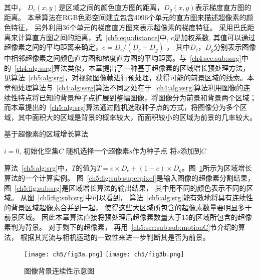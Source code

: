 其中， $D_c(x,y)$是区域之间的颜色直方图的距离，$D_g(x,y)$表示梯度直方图的距离。 本章算法在RGB色彩空间建立包含4096个单元的直方图来描述超像素的颜色特征， 另外利用36个单元的梯度直方图来表示超像素的梯度特征。 采用巴氏距离来计算直方图之间的距离，式~\ref{ch5:equ:distance}中, $c$是加权系数, 其值可以通过超像素之间的平均距离来确定，$c = D_c / (D_c + D_g)$  ， 其中$D_c$，$D_g$分别表示图像中相邻超像素之间颜色直方图和梯度直方图的平均距离。与~\ref{ch4:sec:sub:ssrg}中的~\ref{ch4:alg:ssrg}算法类似，本章提出了一种基于超像素的区域增长预处理方法，见算法~\ref{ch5:alg:srg}，对视频图像帧进行预处理，获得可能的前景区域的线索。本章预处理算法与~\ref{ch4:alg:ssrg}算法不同之处在于~\ref{ch4:alg:ssrg}算法利用图像的连续性特点将已知的背景种子点扩展到整幅图像，将图像分为前景和背景两个区域；而本章提出的~\ref{ch5:alg:srg}算法通过随机选取种子点的方式，将图像分为多个区域，其中面积大的区域是背景的概率较大，而面积较小的区域为前景的几率较大。
\renewcommand{\algorithmcfname}{算法}
\begin{algorithm}[ht]
\caption{基于超像素的区域增长算法}
\label{ch5:alg:srg}
\LinesNumbered
{}
  $i=0$, 初始化空集$C$ \;
 随机选择一个超像素$s$作为种子点\;
 将$s$添加到$C$ \;
\end{algorithm}

算法~\ref{ch5:alg:srg}中，$T$的值为$T= c \times D_c + (1-c) \times D_g$。图~\ref{ch5:fig:srg}所示为区域增长算法的一个计算实例。 图~\ref{ch5:fig:sub:superpixel}是输入图像的超像素分割结果， 图~\ref{ch5:fig:sub:srg}是区域增长算法的输出结果， 其中用不同的颜色表示不同的区域。 从图~\ref{ch5:fig:sub:srg}中可以看到， 算法~\ref{ch5:alg:srg}能有效地将具有连续性的背景区域超像素合并到一起， 使得这些大区域所包含的超像素数量要明显多于前景区域。 因此本章算法直接将预处理后超像素数量大于15的区域所包含的超像素判为背景。 对于剩下的超像素， 再用~\ref{ch5:sec:sub:sub:motionC}节介绍的算法， 根据其光流与相机运动的一致性来进一步判断其是否为前景。
 \begin{figure}[htb]
  \centering%
    {\texttt{[image: ch5/fig3a.png]}}%
 \hspace{1em}%
      {\texttt{[image: ch5/fig3b.png]}}

  \caption{图像背景连续性示意图}\label{ch5:fig:srg}
\end{figure}

